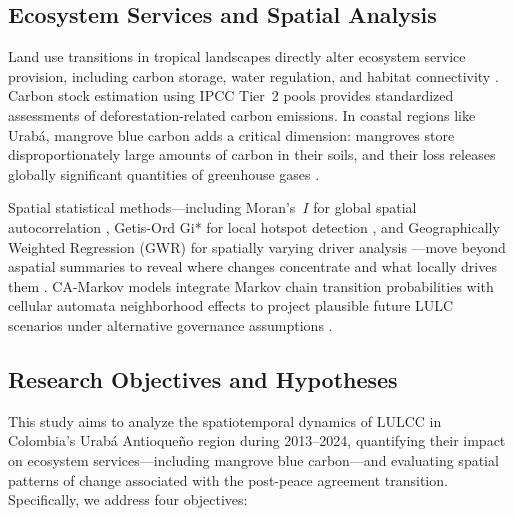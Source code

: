 \documentclass[12pt,a4paper]{article}
\begin{document}
\subsection{Ecosystem Services and Spatial Analysis}

Land use transitions in tropical landscapes directly alter ecosystem service provision, including carbon storage, water regulation, and habitat connectivity \citep{Costanza2014,Li2023,Zhao2022,RuizAgudelo2022}. Carbon stock estimation using IPCC Tier~2 pools \citep{IPCC2006} provides standardized assessments of deforestation-related carbon emissions. In coastal regions like Urab\'{a}, mangrove blue carbon adds a critical dimension: mangroves store disproportionately large amounts of carbon in their soils, and their loss releases globally significant quantities of greenhouse gases \citep{Donato2011,Alongi2014,Twilley2018}.

Spatial statistical methods---including Moran's~$I$ for global spatial autocorrelation \citep{Moran1950,Anselin1995}, Getis-Ord Gi* for local hotspot detection \citep{Getis1992}, and Geographically Weighted Regression (GWR) for spatially varying driver analysis \citep{Fotheringham2002}---move beyond aspatial summaries to reveal where changes concentrate and what locally drives them \citep{TapiaArmijos2019,Botero2023}. CA-Markov models integrate Markov chain transition probabilities with cellular automata neighborhood effects to project plausible future LULC scenarios under alternative governance assumptions \citep{Halmy2015,Verburg2002,Ahmed2025}.

\subsection{Research Objectives and Hypotheses}

This study aims to analyze the spatiotemporal dynamics of LULCC in Colombia's Urab\'{a} Antioque\~{n}o region during 2013--2024, quantifying their impact on ecosystem services---including mangrove blue carbon---and evaluating spatial patterns of change associated with the post-peace agreement transition. Specifically, we address four objectives:
\end{document}
